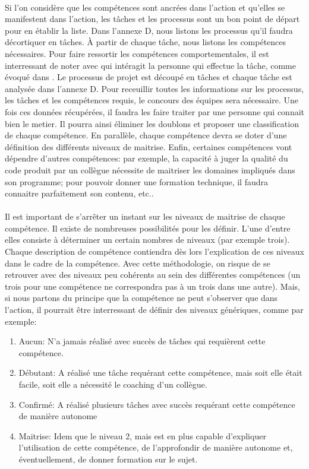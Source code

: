 \paragraph{}Si l'on considère que les compétences sont ancrées dans l'action et qu'elles se manifestent dans l'action, les tâches et les processus sont un bon point de départ pour en établir la liste.  Dans l'annexe D, nous listons les processus qu'il faudra décortiquer en tâches. À partir de chaque tâche, nous listons les compétences nécessaires. Pour faire ressortir les compétences comportementales, il est interressant de noter avec qui intéragit la personne qui effectue la tâche, comme évoqué dans \citep[pp. 185]{refcompetence}. Le processus de projet est découpé en tâches et chaque tâche est analysée dans l'annexe D. Pour receuillir toutes les informations sur les processus, les tâches et les compétences requis, le concours des équipes sera nécessaire. Une fois ces données récupérées, il faudra les faire traiter par une personne qui connait bien le metier. Il pourra ainsi éliminer les doublons et proposer une classification de chaque compétence. En parallèle, chaque compétence devra se doter d'une définition des différents niveaux de maitrise. Enfin, certaines compétences vont dépendre d'autres compétences: par exemple, la capacité à juger la qualité du code produit par un collègue nécessite de maitriser les domaines impliqués dans son programme; pour pouvoir donner une formation technique, il faudra connaitre parfaitement son contenu, etc.. 

\paragraph{} Il est important de s'arrêter un instant sur les niveaux de maitrise de chaque compétence. Il existe de nombreuses possibilités pour les définir. L'une d'entre elles consiste à déterminer un certain nombres de niveaux (par exemple trois). Chaque description de compétence contiendra dès lors l'explication de ces niveaux dans le cadre de la compétence. Avec cette méthodologie, on risque de se retrouver avec des niveaux peu cohérents au sein des différentes compétences (un trois pour une compétence ne correspondra pas à un trois dans une autre). Mais, si nous partons du principe que la compétence ne peut s'observer que dans l'action, il pourrait être interressant de définir des niveaux génériques, comme par exemple: 
\begin{enumerate}
  \item Aucun: N'a jamais réalisé avec succès de tâches qui requièrent cette compétence.
  \item Débutant: A réalisé une tâche requérant cette compétence, mais soit elle était facile, soit elle a nécessité le coaching d'un collègue. 
  \item Confirmé: A réalisé plusieurs tâches avec succès requérant cette compétence de manière autonome
  \item Maitrise: Idem que le niveau 2, mais est en plus capable d'expliquer l'utilisation de cette compétence, de l'approfondir de manière autonome et, éventuellement, de donner formation sur le sujet.
\end{enumerate}
